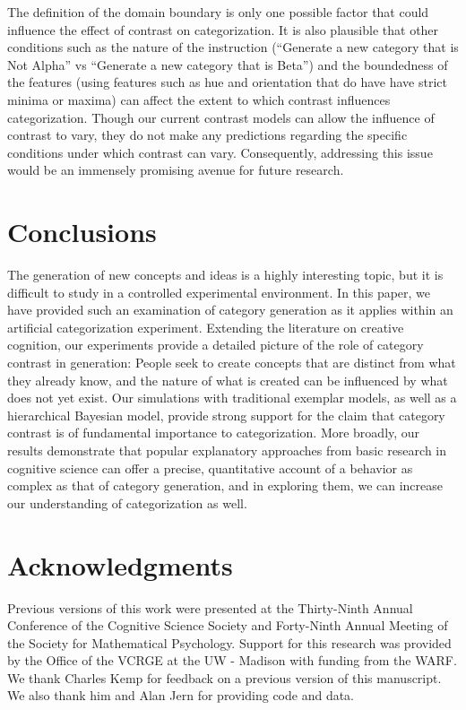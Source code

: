 \documentclass[12pt]{article}
\begin{document}
\begin{flushleft}
The definition of the domain boundary is only one possible factor that could
influence the effect of contrast on categorization. It is also plausible that
other conditions such as the nature of the instruction (``Generate a new
category that is Not Alpha'' vs ``Generate a new category that is Beta'') and
the boundedness of the features (using features such as hue and orientation that
do have have strict minima or maxima) can affect the extent to which contrast
influences categorization. Though our current contrast models can allow the
influence of contrast to vary, they do not make any predictions regarding the
specific conditions under which contrast can vary. Consequently,
addressing this issue would be an immensely promising avenue for future
research.

\section{Conclusions}

The generation of new concepts and ideas is a highly interesting topic, but it
is difficult to study in a controlled experimental environment. In this paper,
we have provided such an examination of category generation as it applies within
an artificial categorization experiment. Extending the literature on creative
cognition, our experiments provide a detailed picture of the role of category
contrast in generation: People seek to create concepts that are distinct from
what they already know, and the nature of what is created can be influenced by
what does not yet exist. Our simulations with traditional exemplar models, as
well as a hierarchical Bayesian model, provide strong support for the claim that
category contrast is of fundamental importance to categorization. More broadly,
our results demonstrate that popular explanatory approaches from basic research
in cognitive science can offer a precise, quantitative account of a behavior as
complex as that of category generation, and in exploring them, we can increase
our understanding of categorization as well.


\clearpage
\section{Acknowledgments} Previous versions of this work were presented at the
Thirty-Ninth Annual Conference of the Cognitive Science Society and Forty-Ninth
Annual Meeting of the Society for Mathematical Psychology. Support for this
research was provided by the Office of the VCRGE at the UW - Madison with
funding from the WARF. We thank Charles Kemp for feedback on a previous version
of this manuscript. We also thank him and Alan Jern for providing code and data.
\end{flushleft}
\end{document}
